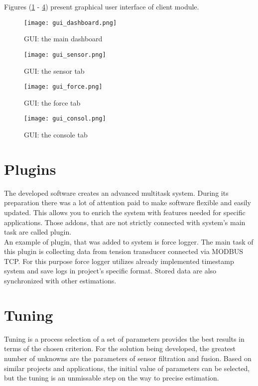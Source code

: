 Figures (\ref{gui1} - \ref{gui4}) present graphical user interface of client module.

\begin{figure}[!h]
	\centering
	\texttt{[image: gui\_dashboard.png]}
	\caption{GUI: the main dashboard}
	\label{gui1}
\end{figure}

\begin{figure}[!h]
	\centering
	\texttt{[image: gui\_sensor.png]}
	\caption{GUI: the sensor tab}
	\label{gui2}
\end{figure}

\begin{figure}[!h]
	\centering
	\texttt{[image: gui\_force.png]}
	\caption{GUI: the force tab}
	\label{gui3}
\end{figure}

\begin{figure}[!h]
	\centering
	\texttt{[image: gui\_consol.png]}
	\caption{GUI: the console tab}
	\label{gui4}
\end{figure}

\section{Plugins}

The developed software creates an advanced multitask system. During its preparation there was a lot of attention paid to make software flexible and easily updated. This allows you to enrich the system with features needed for specific applications. Those addons, that are not strictly connected with system's main task are called plugin.\\

An example of plugin, that was added to system is force logger. The main task of this plugin is collecting data from tension transducer connected via MODBUS TCP. For this purpose force logger utilizes already implemented timestamp system and save logs in project's specific format. Stored data are also synchronized with other estimations.

\section{Tuning}

Tuning is a process selection of a set of parameters provides the best results in terms of the chosen criterion. For the solution being developed, the greatest number of unknowns are the parameters of sensor filtration and fusion. Based on similar projects and applications, the initial value of parameters can be selected, but the tuning is an unmissable step on the way to precise estimation.\\

